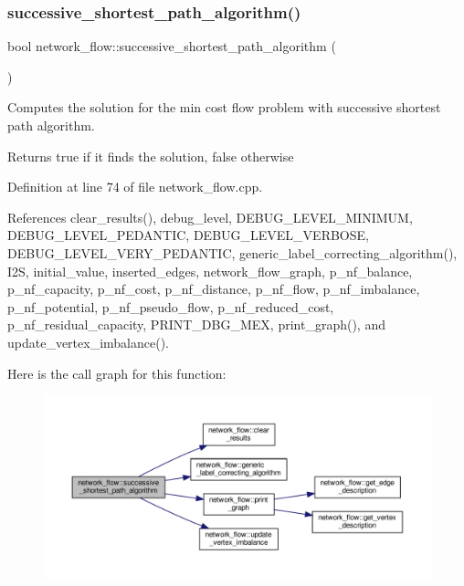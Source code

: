 \subsubsection{\texorpdfstring{successive\+\_\+shortest\+\_\+path\+\_\+algorithm()}{successive\_shortest\_path\_algorithm()}}
{\footnotesize\ttfamily bool network\+\_\+flow\+::successive\+\_\+shortest\+\_\+path\+\_\+algorithm (\begin{DoxyParamCaption}{ }\end{DoxyParamCaption})}



Computes the solution for the min cost flow problem with successive shortest path algorithm. 

\begin{DoxyReturn}{Returns}
true if it finds the solution, false otherwise 
\end{DoxyReturn}


Definition at line 74 of file network\+\_\+flow.\+cpp.



References clear\+\_\+results(), debug\+\_\+level, D\+E\+B\+U\+G\+\_\+\+L\+E\+V\+E\+L\+\_\+\+M\+I\+N\+I\+M\+UM, D\+E\+B\+U\+G\+\_\+\+L\+E\+V\+E\+L\+\_\+\+P\+E\+D\+A\+N\+T\+IC, D\+E\+B\+U\+G\+\_\+\+L\+E\+V\+E\+L\+\_\+\+V\+E\+R\+B\+O\+SE, D\+E\+B\+U\+G\+\_\+\+L\+E\+V\+E\+L\+\_\+\+V\+E\+R\+Y\+\_\+\+P\+E\+D\+A\+N\+T\+IC, generic\+\_\+label\+\_\+correcting\+\_\+algorithm(), I2S, initial\+\_\+value, inserted\+\_\+edges, network\+\_\+flow\+\_\+graph, p\+\_\+nf\+\_\+balance, p\+\_\+nf\+\_\+capacity, p\+\_\+nf\+\_\+cost, p\+\_\+nf\+\_\+distance, p\+\_\+nf\+\_\+flow, p\+\_\+nf\+\_\+imbalance, p\+\_\+nf\+\_\+potential, p\+\_\+nf\+\_\+pseudo\+\_\+flow, p\+\_\+nf\+\_\+reduced\+\_\+cost, p\+\_\+nf\+\_\+residual\+\_\+capacity, P\+R\+I\+N\+T\+\_\+\+D\+B\+G\+\_\+\+M\+EX, print\+\_\+graph(), and update\+\_\+vertex\+\_\+imbalance().

Here is the call graph for this function\+:
\nopagebreak
\begin{figure}[H]
\begin{center}
\leavevmode
\includegraphics[width=350pt]{d2/d4f/classnetwork__flow_a69ab021e187be369fbf1e6c068942224_cgraph}
\end{center}
\end{figure}
\mbox{\label{classnetwork__flow_a7ed1ac1a83151c5af0026a72b84405bb}} 
